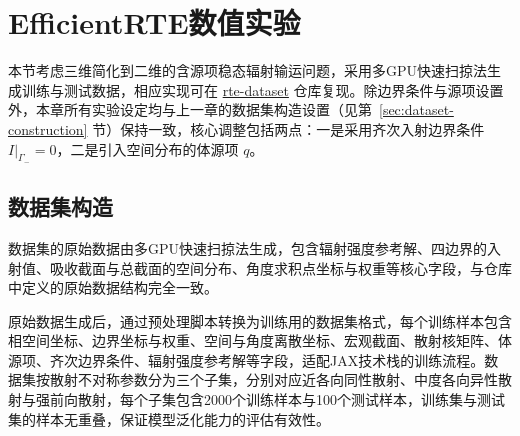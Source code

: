 \section{EfficientRTE数值实验}

本节考虑三维简化到二维的含源项稳态辐射输运问题，采用多GPU快速扫掠法生成训练与测试数据，相应实现可在 \href{https://github.com/mazhengcn/rte-dataset}{rte-dataset} 仓库复现。除边界条件与源项设置外，本章所有实验设定均与上一章的数据集构造设置（见第~\ref{sec:dataset-construction} 节）保持一致，核心调整包括两点：一是采用齐次入射边界条件 $I\vert_{\Gamma_-}=0$，二是引入空间分布的体源项 $q$。

\subsection{数据集构造}
数据集的原始数据由多GPU快速扫掠法生成，包含辐射强度参考解、四边界的入射值、吸收截面与总截面的空间分布、角度求积点坐标与权重等核心字段，与仓库中定义的原始数据结构完全一致。

原始数据生成后，通过预处理脚本转换为训练用的数据集格式，每个训练样本包含相空间坐标、边界坐标与权重、空间与角度离散坐标、宏观截面、散射核矩阵、体源项、齐次边界条件、辐射强度参考解等字段，适配JAX技术栈的训练流程。数据集按散射不对称参数分为三个子集，分别对应近各向同性散射、中度各向异性散射与强前向散射，每个子集包含2000个训练样本与100个测试样本，训练集与测试集的样本无重叠，保证模型泛化能力的评估有效性。



